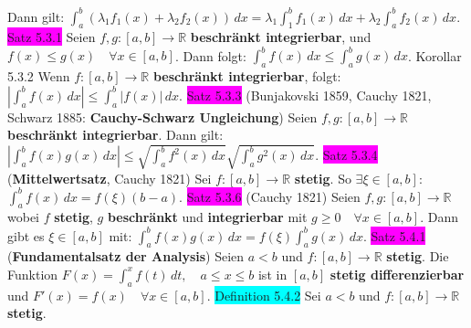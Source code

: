 \documentclass[landscape, 10pt]{article}
\newcommand{\R}{\mathbb{R}}
\begin{document}
\begin{multicols}{3}
                Dann gilt: 
                \textcolor{NavyBlue}{$\int_a^b(\lambda_1f_1(x)+\lambda_2f_2(x))\,dx
                =\lambda_1\int_1^bf_1(x)\,dx+\lambda_2\int_a^bf_2(x)\,dx$}. 
\colorbox{magenta}{Satz 5.3.1} Seien \textcolor{NavyBlue}{$f,g:[a,b]\longrightarrow\R$}
                \textbf{beschränkt integrierbar}, und 
                \textcolor{NavyBlue}{$f(x)\leqslant g(x)\quad\forall x\in[a,b]$}.
                Dann folgt: 
         \textcolor{NavyBlue}{$\int_a^bf(x)\,dx\leqslant\int_a^bg(x)\,dx$}. 
\colorbox{BurntOrange}{Korollar 5.3.2} Wenn 
                \textcolor{NavyBlue}{$f:[a,b]\longrightarrow\R$} 
                \textbf{beschränkt integrierbar}, folgt: 
                \textcolor{NavyBlue}{$|\int_a^bf(x)\,dx|\leqslant\int_a^b|f(x)|\,dx$}.
\colorbox{magenta}{Satz 5.3.3} (Bunjakovski 1859, Cauchy 1821, 
                Schwarz 1885: \textbf{Cauchy-Schwarz Ungleichung}) 
                Seien 
         \textcolor{NavyBlue}{$f,g:[a,b]\longrightarrow\R$}
                \textbf{beschränkt integrierbar}. Dann gilt: 
                \textcolor{NavyBlue}{$|\int_a^bf(x)g(x)\,dx|
                \leqslant\sqrt{\int_a^bf^2(x)\,dx}\sqrt{\int_a^bg^2(x)\,dx}$}.
\colorbox{magenta}{Satz 5.3.4} (\textbf{Mittelwertsatz}, Cauchy 1821) Sei 
                \textcolor{NavyBlue}{$f:[a,b]\longrightarrow\R$} \textbf{stetig}.
                So \textcolor{NavyBlue}{$\exists\xi\in[a,b]$}:\, 
                \textcolor{NavyBlue}{$\int_a^bf(x)\,dx=f(\xi)(b-a)$}.
\colorbox{magenta}{Satz 5.3.6} (Cauchy 1821) Seien 
                \textcolor{NavyBlue}{$f,g:[a,b]\longrightarrow\R$} wobei 
                \textcolor{NavyBlue}{$f$} \textbf{stetig}, 
                \textcolor{NavyBlue}{$g$} \textbf{beschränkt} und \textbf{integrierbar} mit 
         \textcolor{NavyBlue}{$g\geqslant0\quad\forall x\in[a,b]$}. Dann gibt es 
                \textcolor{NavyBlue}{$\xi\in[a,b]$} mit: 
                \textcolor{NavyBlue}{$\int_a^bf(x)g(x)\,dx=f(\xi)\int_a^bg(x)\,dx$}. 
\colorbox{magenta}{Satz 5.4.1} (\textbf{Fundamentalsatz der Analysis}) 
                Seien \textcolor{NavyBlue}{$a<b$} und 
                \textcolor{NavyBlue}{$f:[a,b]\longrightarrow\R$} 
                \textbf{stetig}. Die Funktion 
         \textcolor{NavyBlue}{$F(x)=\int_a^xf(t)\,dt,\quad a\leqslant x\leqslant b$} 
                ist in \textcolor{NavyBlue}{$[a,b]$} \textbf{stetig differenzierbar} 
                und \textcolor{NavyBlue}{$F'(x)=f(x)\quad\forall x\in[a,b]$}.
\colorbox{cyan}{Definition 5.4.2} Sei \textcolor{NavyBlue}{$a<b$} und 
                \textcolor{NavyBlue}{$f:[a,b]\longrightarrow\R$} \textbf{stetig}. 

\end{multicols}
\end{document}
